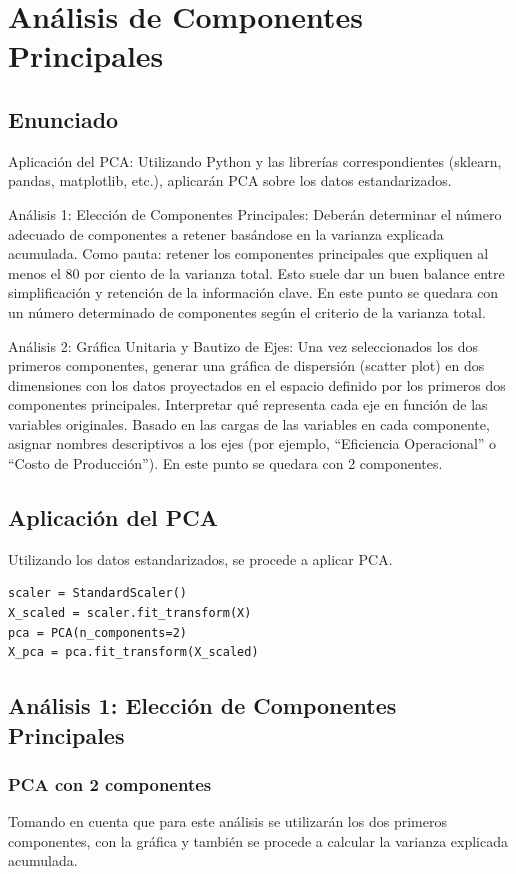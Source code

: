 \newpage
\section{Análisis de Componentes Principales}
\subsection{Enunciado}
Aplicación del PCA: Utilizando Python y las librerías correspondientes (sklearn, pandas, matplotlib, etc.), aplicarán PCA sobre los datos estandarizados.

Análisis 1: Elección de Componentes Principales: Deberán determinar el número 
adecuado de componentes a retener basándose en la varianza explicada acumulada. 
Como pauta: retener los componentes principales que expliquen al menos el 80 por ciento
de la varianza total. Esto suele dar un buen balance entre simplificación y retención 
de la información clave. En este punto se quedara con un número determinado de componentes según el criterio de la varianza total.

Análisis 2: Gráfica Unitaria y Bautizo de Ejes:
Una vez seleccionados los dos primeros componentes, generar una gráfica de dispersión 
(scatter plot) en dos dimensiones con los datos proyectados en el espacio definido por 
los primeros dos componentes principales. Interpretar qué representa cada eje en 
función de las variables originales. Basado en las cargas de las variables en cada componente, asignar nombres descriptivos a los ejes (por ejemplo, “Eficiencia Operacional” o “Costo de Producción”). En este punto se quedara con 2 componentes.

\subsection{Aplicación del PCA}
Utilizando los datos estandarizados, se procede a aplicar PCA.

\begin{verbatim}
scaler = StandardScaler()
X_scaled = scaler.fit_transform(X)
pca = PCA(n_components=2) 
X_pca = pca.fit_transform(X_scaled)
\end{verbatim}


\subsection{Análisis 1: Elección de Componentes Principales}
\subsubsection{PCA con 2 componentes}
Tomando en cuenta que para este análisis se utilizarán los dos primeros componentes, 
con la gráfica y también se procede a calcular la varianza explicada acumulada.

